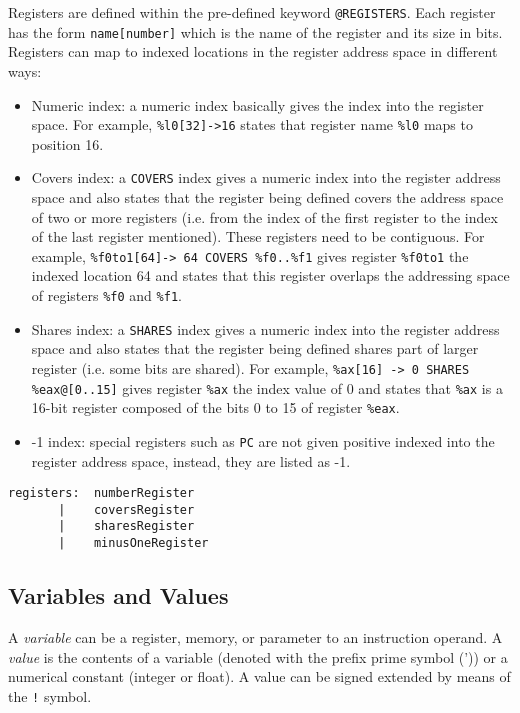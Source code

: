 Registers are defined within the pre-defined keyword \texttt{@REGISTERS}. 
Each register has the form \texttt{name[number]} which is the name 
of the register and its size in bits.  Registers can map to indexed 
locations in the register address space in different ways: 
\begin{itemize}
\item Numeric index: a numeric index basically gives the index into 
	the register space.  For example, \texttt{\%l0[32]->16} states that
	register name \texttt{\%l0} maps to position 16. 

\item Covers index: a \texttt{COVERS} index gives a numeric index into 
	the register address space and also states that the register
	being defined covers the address space of two or more registers (i.e.
	from the index of the first register to the index of the last 
	register mentioned). These registers need to be contiguous.  For example, 
	\texttt{\%f0to1[64]-> 64 COVERS \%f0..\%f1} gives register 
	\texttt{\%f0to1} the indexed location 64 and states that this 
	register overlaps the addressing space of registers \texttt{\%f0} 
	and \texttt{\%f1}.

\item Shares index: a \texttt{SHARES} index gives a numeric index into
	the register address space and also states that the register 
	being defined shares part of larger register (i.e. some bits 
	are shared).  For example,
	\texttt{\%ax[16] -> 0 SHARES \%eax@[0..15]} gives register 
	\texttt{\%ax} the index value of 0 and states that \texttt{\%ax} 
	is a 16-bit register composed of the bits 0 to 15 of register
	\texttt{\%eax}. 

\item -1 index: special registers such as \texttt{PC} are not given
	positive indexed into the register address space, instead, they 
	are listed as -1.
\end{itemize}

{\small
\begin{verbatim}
registers:  numberRegister
       |    coversRegister
       |    sharesRegister
       |    minusOneRegister
\end{verbatim}
}



\subsection{Variables and Values}
A \emph{variable} can be a register, memory, or parameter to an 
instruction operand.  
A \emph{value} is the contents of a variable (denoted with the
prefix prime symbol (')) or a numerical constant (integer or float).
A value can be signed extended by means of the \texttt{!} symbol.

